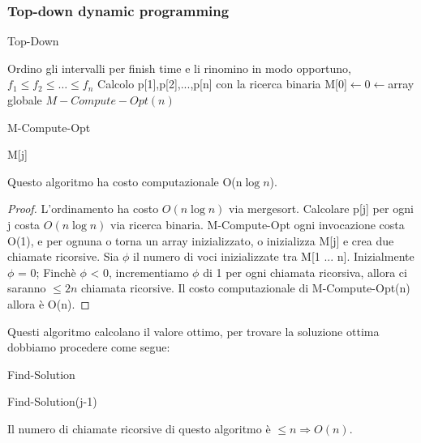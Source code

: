 \documentclass{article}
\begin{document}
\subsubsection{Top-down dynamic programming}
\begin{center}
\begin{algorithm}
\caption{Top-Down}
Ordino gli intervalli per finish time e li rinomino in modo opportuno, $f_1 \leq f_2 \leq \dots \leq f_n$\;
Calcolo p[1],p[2],...,p[n] con la ricerca binaria\;
M[0]$\leftarrow0 \leftarrow $array globale\;
\Return $M-Compute-Opt(n)$\;
\end{algorithm}
\end{center}
\begin{center}
\begin{algorithm}
\caption{M-Compute-Opt}
\Return M[j]\;
\end{algorithm}
\end{center}
Questo algoritmo ha costo computazionale O(n$\log n$).
\begin{proof}
    L'ordinamento ha costo $O(n \log n)$ via mergesort. Calcolare p[j] per ogni j costa $O(n \log n)$ via ricerca binaria.
    M-Compute-Opt ogni invocazione costa O(1), e per ognuna o torna un array inizializzato, o inizializza M[j] e crea due chiamate ricorsive.
    Sia $\phi$ il numero di voci inizializzate tra M[1 ... n]. Inizialmente $\phi$ = 0; Finchè $\phi$ < 0, incrementiamo $\phi$  di 1 per ogni chiamata ricorsiva, allora ci saranno $\leq 2n$ chiamata ricorsive. Il costo computazionale di M-Compute-Opt(n) allora è O(n).
\end{proof}
Questi algoritmo calcolano il valore ottimo, per trovare la soluzione ottima dobbiamo procedere come segue:
\begin{center}
\begin{algorithm}
\caption{Find-Solution}
\KwResult{[]}
\Return Find-Solution(j-1)\;
\end{algorithm}
\end{center}
Il numero di chiamate ricorsive di questo algoritmo è $\leq n \Rightarrow O(n)$.
\end{document}
